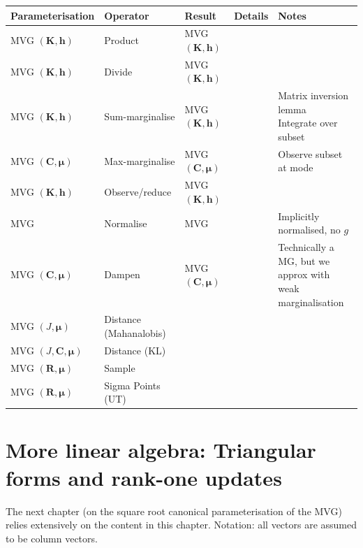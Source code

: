 \documentclass[oneside,english]{scrbook}
\begin{document}
\begin{tabular}{lllll}
  Parameterisation         & Operator               & Result                 & Details & Notes\\ \hline
  MVG $(\bm{K},\bm{h})$     & Product                & MVG $(\bm{K},\bm{h})$   &         & \parbox{0.3\textwidth}{}\\
  MVG $(\bm{K},\bm{h})$     & Divide                 & MVG $(\bm{K},\bm{h})$   &         & \parbox{0.3\textwidth}{}\\
  MVG $(\bm{K},\bm{h})$     & Sum-marginalise        & MVG $(\bm{K},\bm{h})$   &         & \parbox{0.3\textwidth}{Matrix inversion lemma \\ Integrate over subset}\\
  MVG $(\bm{C},\bm{\mu})$   & Max-marginalise        & MVG $(\bm{C},\bm{\mu})$ &         & \parbox{0.3\textwidth}{Observe subset at mode}\\
  MVG $(\bm{K},\bm{h})$     & Observe/reduce         & MVG $(\bm{K},\bm{h})$   &         & \parbox{0.3\textwidth}{}\\
  MVG                      & Normalise              & MVG                    &         & \parbox{0.3\textwidth}{Implicitly normalised, no $g$}\\
  MVG $(\bm{C},\bm{\mu})$   & Dampen                 & MVG $(\bm{C},\bm{\mu})$ &         & \parbox{0.3\textwidth}{Technically a MG, but we \\approx with weak marginalisation}\\
  MVG $(J,\bm{\mu})$   & Distance (Mahanalobis) &                        &         & \parbox{0.3\textwidth}{}\\
  MVG $(J,\bm{C},\bm{\mu})$ & Distance (KL)          &                        &         & \parbox{0.3\textwidth}{}\\
  MVG $(\bm{R},\bm{\mu})$   & Sample                 &                        &         & \parbox{0.3\textwidth}{}\\
  MVG $(\bm{R},\bm{\mu})$   & Sigma Points (UT)      &                        &         & \parbox{0.3\textwidth}{}\\
\end{tabular}


\chapter{More linear algebra: Triangular forms and rank-one updates}

The next chapter (on the square root canonical parameterisation of the
MVG) relies extensively on the content in this chapter. Notation: all
vectors are assumed to be column vectors.
\end{document}
